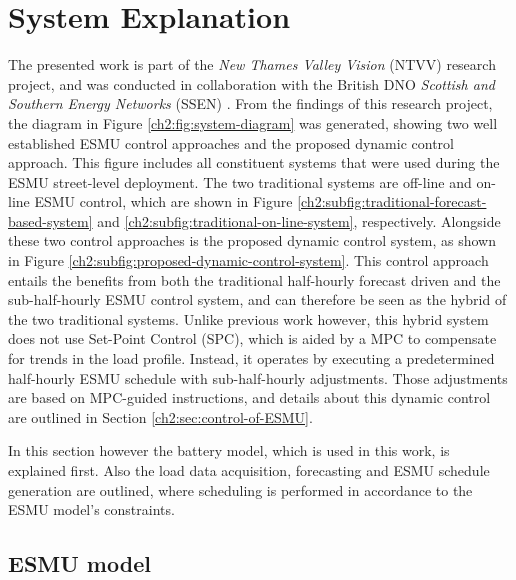 \section{System Explanation}
\label{ch2:sec:system-explanation}



The presented work is part of the \textit{New Thames Valley Vision} (NTVV) research project, and was conducted in collaboration with the British DNO \textit{Scottish and Southern Energy Networks} (SSEN) \cite{NTVV2016}.
From the findings of this research project, the diagram in Figure \ref{ch2:fig:system-diagram} was generated, showing two well established ESMU control approaches and the proposed dynamic control approach.
This figure includes all constituent systems that were used during the ESMU street-level deployment.
The two traditional systems are off-line and on-line ESMU control, which are shown in Figure \ref{ch2:subfig:traditional-forecast-based-system} and \ref{ch2:subfig:traditional-on-line-system}, respectively.
Alongside these two control approaches is the proposed dynamic control system, as shown in Figure \ref{ch2:subfig:proposed-dynamic-control-system}.
This control approach entails the benefits from both the traditional half-hourly forecast driven and the sub-half-hourly ESMU control system, and can therefore be seen as the hybrid of the two traditional systems.
Unlike previous work however, this hybrid system does not use Set-Point Control (SPC), which is aided by a MPC to compensate for trends in the load profile.
Instead, it operates by executing a predetermined half-hourly ESMU schedule with sub-half-hourly adjustments.
Those adjustments are based on MPC-guided instructions, and details about this dynamic control are outlined in Section \ref{ch2:sec:control-of-ESMU}.

In this section however the battery model, which is used in this work, is explained first.
Also the load data acquisition, forecasting and ESMU schedule generation are outlined, where scheduling is performed in accordance to the ESMU model's constraints.

\subsection{ESMU model}

